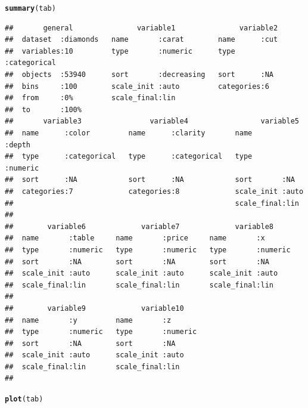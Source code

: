 \documentclass[11pt, fleqn, a4paper]{article}\usepackage{graphicx, color}
\makeatletter
\newcommand{\hlfunctioncall}[1]{\textcolor[rgb]{0.501960784313725,0,0.329411764705882}{\textbf{#1}}}%
\newenvironment{kframe}{%
 \def\FrameCommand##1{\hskip\@totalleftmargin \hskip-\fboxsep
 \colorbox{shadecolor}{##1}\hskip-\fboxsep
     \hskip-\linewidth \hskip-\@totalleftmargin \hskip\columnwidth}%
 \MakeFramed {\advance\hsize-\width
   \@totalleftmargin\z@ \linewidth\hsize
   \@setminipage}}%
 {\par\unskip\endMakeFramed}
\newenvironment{knitrout}{}{} %
\makeatother
\begin{document}
\begin{knitrout}\scriptsize
{}\color{fgcolor}\begin{kframe}
\begin{alltt}
\hlfunctioncall{summary}(tab)
\end{alltt}
\begin{verbatim}
##       general               variable1               variable2          
##  dataset  :diamonds   name       :carat        name      :cut          
##  variables:10         type       :numeric      type      :categorical  
##  objects  :53940      sort       :decreasing   sort      :NA           
##  bins     :100        scale_init :auto         categories:6            
##  from     :0%         scale_final:lin                                  
##  to       :100%                                                        
##       variable3                variable4                 variable5      
##  name      :color         name      :clarity       name       :depth    
##  type      :categorical   type      :categorical   type       :numeric  
##  sort      :NA            sort      :NA            sort       :NA       
##  categories:7             categories:8             scale_init :auto     
##                                                    scale_final:lin      
##                                                                         
##        variable6             variable7             variable8      
##  name       :table     name       :price     name       :x        
##  type       :numeric   type       :numeric   type       :numeric  
##  sort       :NA        sort       :NA        sort       :NA       
##  scale_init :auto      scale_init :auto      scale_init :auto     
##  scale_final:lin       scale_final:lin       scale_final:lin      
##                                                                   
##        variable9             variable10     
##  name       :y         name       :z        
##  type       :numeric   type       :numeric  
##  sort       :NA        sort       :NA       
##  scale_init :auto      scale_init :auto     
##  scale_final:lin       scale_final:lin      
##                                             
\end{verbatim}
\begin{alltt}
\hlfunctioncall{plot}(tab)
\end{alltt}
\end{kframe}
\end{knitrout}
\end{document}
